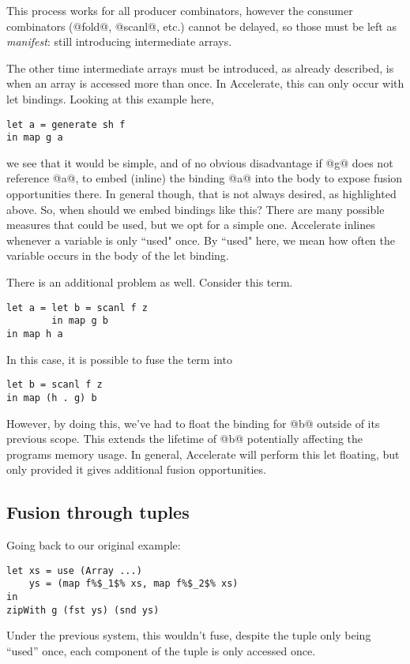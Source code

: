 This process works for all producer combinators, however the consumer combinators (@fold@, @scanl@, etc.) cannot be delayed, so those must be left as \emph{manifest}: still introducing intermediate arrays.

The other time intermediate arrays must be introduced, as already described, is when an array is accessed more than once. In Accelerate, this can only occur with let bindings. Looking at this example here,
%
\begin{lstlisting}
let a = generate sh f
in map g a
\end{lstlisting}
%
we see that it would be simple, and of no obvious disadvantage if @g@ does not reference @a@, to embed (inline) the binding @a@ into the body to expose fusion opportunities there. In general though, that is not always desired, as highlighted above. So, when should we embed bindings like this? There are many possible measures that could be used, but we opt for a simple one. Accelerate inlines whenever a variable is only ``used" once. By ``used" here, we mean how often the variable occurs in the body of the let binding.

There is an additional problem as well. Consider this term.
%
\begin{lstlisting}
let a = let b = scanl f z
        in map g b
in map h a
\end{lstlisting}
%
In this case, it is possible to fuse the term into
%
\begin{lstlisting}
let b = scanl f z
in map (h . g) b
\end{lstlisting}
%
However, by doing this, we've had to float the binding for @b@ outside of its previous scope. This extends the lifetime of @b@ potentially affecting the programs memory usage. In general, Accelerate will perform this let floating, but only provided it gives additional fusion opportunities.

\subsection{Fusion through tuples}

Going back to our original example:
%
\begin{lstlisting}
let xs = use (Array ...)
    ys = (map f%$_1$% xs, map f%$_2$% xs)
in
zipWith g (fst ys) (snd ys)
\end{lstlisting}
%
Under the previous system, this wouldn't fuse, despite the tuple only being ``used'' once, each component of the tuple is only accessed once.

